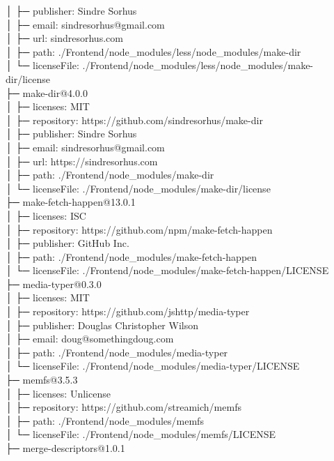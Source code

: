 │  ├─ publisher: Sindre Sorhus\\
│  ├─ email: sindresorhus@gmail.com\\
│  ├─ url: sindresorhus.com\\
│  ├─ path: ./Frontend/node\_modules/less/node\_modules/make-dir\\
│  └─ licenseFile: ./Frontend/node\_modules/less/node\_modules/make-dir/license\\
├─ make-dir@4.0.0\\
│  ├─ licenses: MIT\\
│  ├─ repository: https://github.com/sindresorhus/make-dir\\
│  ├─ publisher: Sindre Sorhus\\
│  ├─ email: sindresorhus@gmail.com\\
│  ├─ url: https://sindresorhus.com\\
│  ├─ path: ./Frontend/node\_modules/make-dir\\
│  └─ licenseFile: ./Frontend/node\_modules/make-dir/license\\
├─ make-fetch-happen@13.0.1\\
│  ├─ licenses: ISC\\
│  ├─ repository: https://github.com/npm/make-fetch-happen\\
│  ├─ publisher: GitHub Inc.\\
│  ├─ path: ./Frontend/node\_modules/make-fetch-happen\\
│  └─ licenseFile: ./Frontend/node\_modules/make-fetch-happen/LICENSE\\
├─ media-typer@0.3.0\\
│  ├─ licenses: MIT\\
│  ├─ repository: https://github.com/jshttp/media-typer\\
│  ├─ publisher: Douglas Christopher Wilson\\
│  ├─ email: doug@somethingdoug.com\\
│  ├─ path: ./Frontend/node\_modules/media-typer\\
│  └─ licenseFile: ./Frontend/node\_modules/media-typer/LICENSE\\
├─ memfs@3.5.3\\
│  ├─ licenses: Unlicense\\
│  ├─ repository: https://github.com/streamich/memfs\\
│  ├─ path: ./Frontend/node\_modules/memfs\\
│  └─ licenseFile: ./Frontend/node\_modules/memfs/LICENSE\\
├─ merge-descriptors@1.0.1\\

